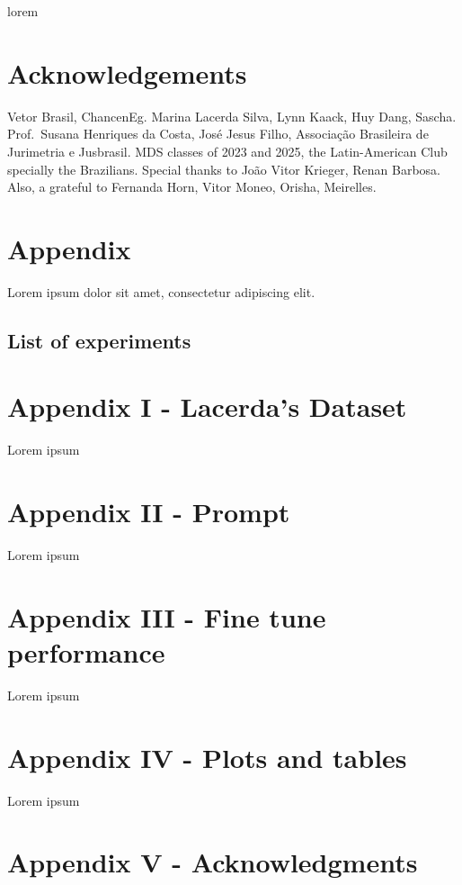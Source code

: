 \documentclass[
  12pt,
  letterpaper,
]{book}
\begin{document}
lorem


\chapter{Acknowledgements}\label{acknowledgements}

Vetor Brasil, ChancenEg. Marina Lacerda Silva, Lynn Kaack, Huy Dang,
Sascha. Prof.~Susana Henriques da Costa, José Jesus Filho, Associação
Brasileira de Jurimetria e Jusbrasil. MDS classes of 2023 and 2025, the
Latin-American Club specially the Brazilians. Special thanks to João
Vitor Krieger, Renan Barbosa. Also, a grateful to Fernanda Horn, Vitor
Moneo, Orisha, Meirelles.


\chapter{Appendix}\label{appendix}

Lorem ipsum dolor sit amet, consectetur adipiscing elit.

\section{List of experiments}\label{list-of-experiments}


\chapter{Appendix I - Lacerda's
Dataset}\label{appendix-i---lacerdas-dataset}

Lorem ipsum


\chapter{Appendix II - Prompt}\label{appendix-ii---prompt}

Lorem ipsum


\chapter{Appendix III - Fine tune
performance}\label{appendix-iii---fine-tune-performance}

Lorem ipsum


\chapter{Appendix IV - Plots and
tables}\label{appendix-iv---plots-and-tables}

Lorem ipsum


\chapter{Appendix V -
Acknowledgments}\label{appendix-v---acknowledgments}


\backmatter
\end{document}
